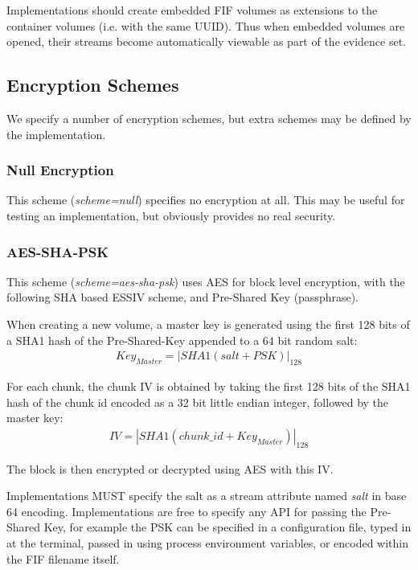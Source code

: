\documentclass[10pt, conference]{IEEEtran}
\begin{document}
Implementations should create embedded FIF volumes as extensions to
the container volumes (i.e. with the same UUID). Thus when embedded
volumes are opened, their streams become automatically viewable as
part of the evidence set.

\subsection{Encryption Schemes}
We specify a number of encryption schemes, but extra schemes may be
defined by the implementation.

\subsubsection{Null Encryption}
This scheme ({\em scheme=null}) specifies no encryption at all. This
may be useful for testing an implementation, but obviously provides
no real security.

\subsubsection{AES-SHA-PSK}
This scheme ({\em scheme=aes-sha-psk}) uses AES for block level
encryption, with the following SHA based ESSIV scheme, and Pre-Shared
Key (passphrase).

When creating a new volume, a master key is generated using the first
128 bits of a SHA1 hash of the Pre-Shared-Key appended to a 64 bit
random salt:
\begin{eqnarray}
Key_{Master} = \left | SHA1(salt + PSK) \right | _{128}
\end{eqnarray}

For each chunk, the chunk IV is obtained by taking the first 128 bits
of the SHA1 hash of the chunk id encoded as a 32 bit little endian
integer, followed by the master key:
\begin{eqnarray}
IV = \left | SHA1(chunk\_id + Key_{Master}) \right | _{128}
\end{eqnarray}

The block is then encrypted or decrypted using AES with this IV.

Implementations MUST specify the salt as a stream attribute named {\em
salt} in base 64 encoding. Implementations are free to specify any API
for passing the Pre-Shared Key, for example the PSK can be specified
in a configuration file, typed in at the terminal, passed in using
process environment variables, or encoded within the FIF filename
itself.
\end{document}
